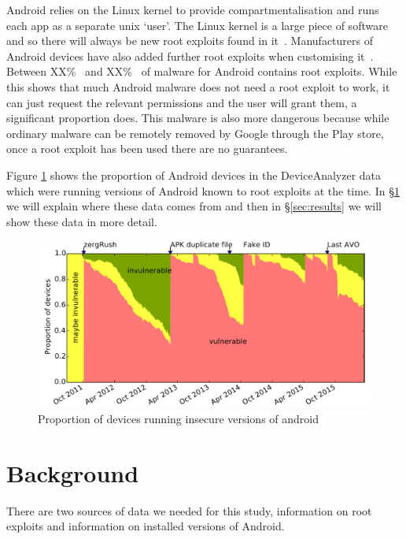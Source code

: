 \documentclass[conference,a4paper,twoside]{IEEEtran}
\begin{document}
Android relies on the Linux kernel to provide compartmentalisation and runs each app as a separate unix `user'.
The Linux kernel is a large piece of software and so there will always be new root exploits found in it~\cite{TODO}.
Manufacturers of Android devices have also added further root exploits when customising it~\cite{TODO}.
Between XX\%~\cite{TODO} and XX\%~\cite{TODO} of malware for Android contains root exploits.
While this shows that much Android malware does not need a root exploit to work, it can just request the relevant permissions and the user will grant them, a significant proportion does.
This malware is also more dangerous because while ordinary malware can be remotely removed by Google through the Play store, once a root exploit has been used there are no guarantees.

Figure \ref{fig:proportioninsecure} shows the proportion of Android devices in the DeviceAnalyzer data which were running versions of Android known to root exploits at the time.
In \S\ref{sec:background} we will explain where these data comes from and then in \S\ref{sec:results} we will show these data in more detail.


\begin{figure}[!b]
\centering
\includegraphics[width=\columnwidth]{figures/proportioninsecure}
\caption{Proportion of devices running insecure versions of android}
\label{fig:proportioninsecure}
\end{figure}

\section{Background}
\label{sec:background}
There are two sources of data we needed for this study, information on root exploits and information on installed versions of Android.
\end{document}
